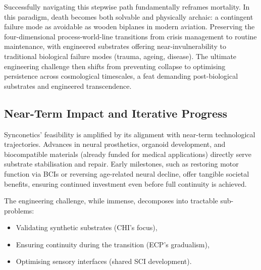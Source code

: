 \documentclass[10pt]{article}
\begin{document}
\begin{sloppypar}

  Successfully navigating this stepwise path fundamentally reframes mortality. In this paradigm, death becomes both solvable and physically archaic: a contingent failure mode as avoidable as wooden biplanes in modern aviation. Preserving the four-dimensional process-world-line transitions from crisis management to routine maintenance, with engineered substrates offering near-invulnerability to traditional biological failure modes (trauma, ageing, disease). The ultimate engineering challenge then shifts from preventing collapse to optimising persistence across cosmological timescales, a feat demanding post-biological substrates and engineered transcendence.

  \subsection{Near-Term Impact and Iterative Progress}
  \label{sec:near-term-impact}

  Synconetics’ feasibility is amplified by its alignment with near-term technological trajectories. Advances in neural prosthetics, organoid development, and biocompatible materials (already funded for medical applications) directly serve substrate stabilisation and repair. Early milestones, such as restoring motor function via BCIs or reversing age-related neural decline, offer tangible societal benefits, ensuring continued investment even before full continuity is achieved.

  The engineering challenge, while immense, decomposes into tractable sub-problems:
  \begin{itemize}
    \item Validating synthetic substrates (CHI’s focus),
    \item Ensuring continuity during the transition (ECP’s gradualism),
    \item Optimising sensory interfaces (shared SCI development).
  \end{itemize}


\end{sloppypar}
\end{document}
